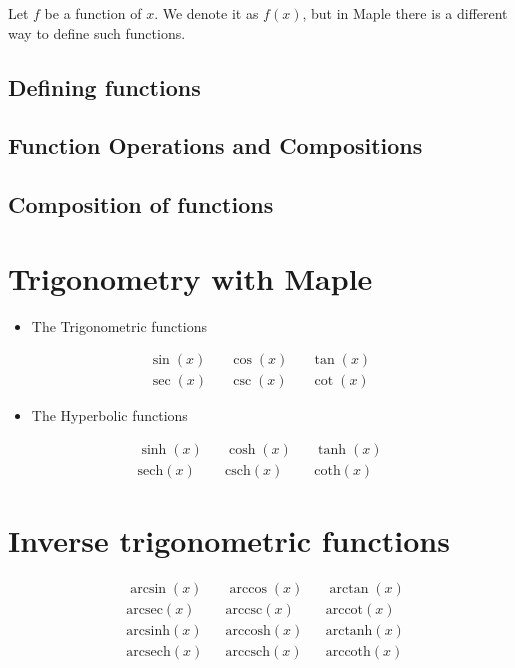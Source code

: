\documentclass[
]{book}
\providecommand{\tightlist}{%
  \setlength{\itemsep}{0pt}\setlength{\parskip}{0pt}}
\theoremstyle{definition}
\theoremstyle{definition}
\theoremstyle{definition}
\theoremstyle{definition}
\theoremstyle{remark}
\begin{document}
Let \(f\) be a function of \(x\). We denote it as \(f(x)\), but in Maple there is a different way to define such functions.

\subsection{Defining functions}\label{defining-functions}

\subsection{Function Operations and Compositions}\label{function-operations-and-compositions}

\subsection{Composition of functions}\label{composition-of-functions}

\section{Trigonometry with Maple}\label{trigonometry-with-maple}

\begin{itemize}
\tightlist
\item
  The Trigonometric functions
\end{itemize}

\[
\begin{aligned}
 \sin(x) && \cos(x) && \tan(x) \\
 \sec(x) && \csc(x) && \cot(x)
\end{aligned}
\]

\begin{itemize}
\tightlist
\item
  The Hyperbolic functions
\end{itemize}

\[
\begin{aligned}
 \sinh(x) && \cosh(x) && \tanh(x) \\
 \text{sech}(x) &&  \text{csch}(x) && \text{coth}(x) 
\end{aligned}
\]

\section{Inverse trigonometric functions}\label{inverse-trigonometric-functions}

\[
\begin{aligned}
 &\arcsin(x)        && \arccos(x)  && \arctan(x)\\
 &\text{arcsec}(x)  && \text{arccsc}(x)  && \text{arccot}(x)\\
 &\text{arcsinh}(x) && \text{arccosh}(x) && \text{arctanh}(x)\\
 &\text{arcsech}(x) && \text{arccsch}(x) && \text{arccoth}(x)
\end{aligned}
\]
\end{document}
